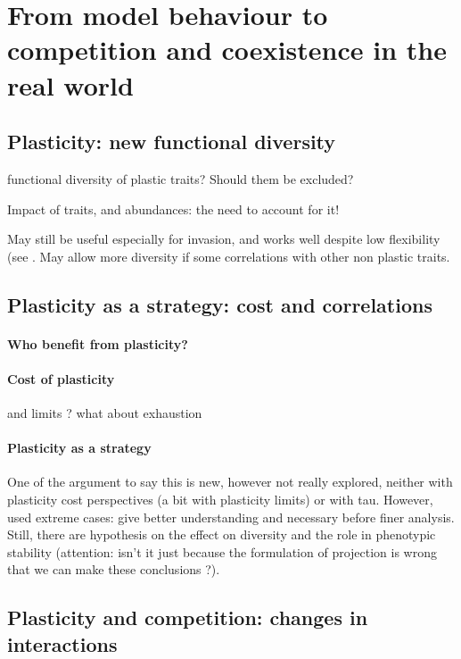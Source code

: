 \section{From model behaviour to competition and coexistence in the real world}

\subsection{Plasticity: new functional diversity}

functional diversity of plastic traits? Should them be excluded?

Impact of traits, and abundances: the need to account for it!

May still be useful especially for invasion, and works well despite low flexibility (see \parencite{forsman_rethinking_2014}. May allow more diversity if some correlations with other non plastic traits.	

\subsection{Plasticity as a strategy: cost and correlations}

\paragraph{Who benefit from plasticity?}

\paragraph{Cost of plasticity}

and limits ? what about exhaustion

\paragraph{Plasticity as a strategy}
One of the argument to say this is new, however not really explored, neither with plasticity cost perspectives (a bit with plasticity limits) or with tau. However, used extreme cases: give better understanding and necessary before finer analysis. Still, there are hypothesis on the effect on diversity and the role in phenotypic stability (attention: isn't it just because the formulation of projection is wrong that we can make these conclusions ?).



\subsection{Plasticity and competition: changes in interactions}

